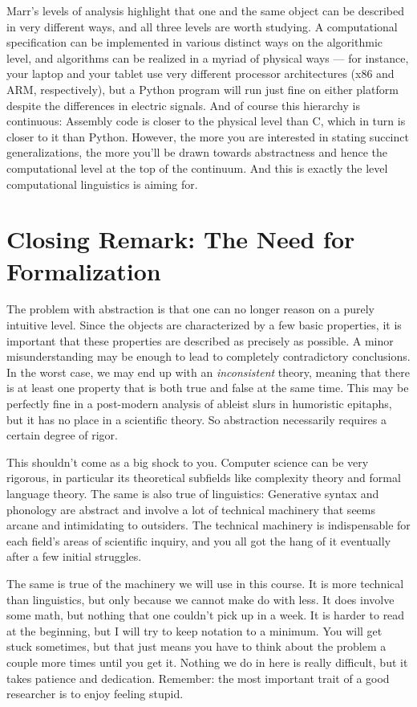%
Marr's levels of analysis highlight that one and the same object can be described in very different ways, and all three levels are worth studying.
A computational specification can be implemented in various distinct ways on the algorithmic level, and algorithms can be realized in a myriad of physical ways --- for instance, your laptop and your tablet use very different processor architectures (x86 and ARM, respectively), but a Python program will run just fine on either platform despite the differences in electric signals.
And of course this hierarchy is continuous: Assembly code is closer to the physical level than C, which in turn is closer to it than Python.
However, the more you are interested in stating succinct generalizations, the more you'll be drawn towards abstractness and hence the computational level at the top of the continuum.
And this is exactly the level computational linguistics is aiming for.

\section{Closing Remark: The Need for Formalization}

The problem with abstraction is that one can no longer reason on a purely intuitive level.
Since the objects are characterized by a few basic properties, it is important that these properties are described as precisely as possible.
A minor misunderstanding may be enough to lead to completely contradictory conclusions.
In the worst case, we may end up with an \emph{inconsistent} theory, meaning that there is at least one property that is both true and false at the same time.
This may be perfectly fine in a post-modern analysis of ableist slurs in humoristic epitaphs, but it has no place in a scientific theory.
So abstraction necessarily requires a certain degree of rigor.

This shouldn't come as a big shock to you.
Computer science can be very rigorous, in particular its theoretical subfields like complexity theory and formal language theory.
The same is also true of linguistics:
Generative syntax and phonology are abstract and involve a lot of technical machinery that seems arcane and intimidating to outsiders.
The technical machinery is indispensable for each field's areas of scientific inquiry, and you all got the hang of it eventually after a few initial struggles.

The same is true of the machinery we will use in this course.
It is more technical than linguistics, but only because we cannot make do with less.
It does involve some math, but nothing that one couldn't pick up in a week.
It is harder to read at the beginning, but I will try to keep notation to a minimum.
You will get stuck sometimes, but that just means you have to think about the problem a couple more times until you get it.
Nothing we do in here is really difficult, but it takes patience and dedication.
Remember: the most important trait of a good researcher is to enjoy feeling stupid.
